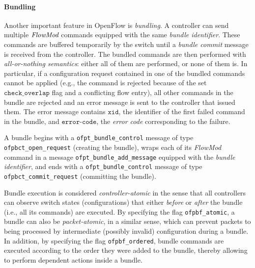 \documentclass[conference]{sigcomm-alternate}
\newcommand{\FlowMod}{\emph{FlowMod}\xspace}
\newcommand{\checko}{\texttt{check\_overlap}\xspace}
\newcommand{\liron}[1]{\textit{\textcolor{mygreen}{[liron]: #1}}} %
\newcommand{\xid}{\texttt{xid}}
\newcommand{\ecode}{\texttt{error-code}}
\begin{document}
\paragraph{Bundling}

Another important feature in OpenFlow is \emph{bundling}. 
A controller can send multiple $\FlowMod$ commands  equipped with 
the same \emph{bundle identifier}.
These commands are buffered temporarily by
the switch until a \emph{bundle commit} message is received from the
controller. 
The bundled commands are then performed with \emph{all-or-nothing semantics}:
either all of them are performed, or none of them is. 
In particular, if a configuration request contained in one of the bundled commands cannot
be applied (e.g., the command is rejected because of the set
$\checko$ flag and a conflicting flow entry), all  other commands in
the bundle are rejected and an error
message is sent to the controller that issued them.
The error message contains $\xid$, the identifier of the first failed command in the
bundle, and $\ecode$, the \emph{error code} corresponding to the failure.   

A bundle begins with a  \texttt{ofpt\_bundle\_control} message of type
\texttt{ofpbct\_open\_request} (creating the bundle), wraps
each of its \emph{FlowMod} command in a message  
\texttt{ofpt\_bundle\_add\_message} equipped with the \emph{bundle
  identifier}, and ends with a \texttt{ofpt\_bundle\_control} message of
type \texttt{ofpbct\_commit\_request} (committing the bundle). 




Bundle execution is considered \emph{controller-atomic} 
in the sense that all controllers can observe switch states (configurations) that either \emph{before} or \emph{after} the
bundle (i.e., all its commands) are executed. 
By specifying the flag \texttt{ofpbf\_atomic},  
a bundle can also be  \emph{packet-atomic}, in a similar sense, which can prevent packets to being processed by intermediate (possibly invalid) configuration during a bundle.
In addition, by specifying the flag \texttt{ofpbf\_ordered},  bundle commands are executed according to the order they were added to the bundle, thereby allowing to perform dependent actions inside a bundle.
\end{document}

